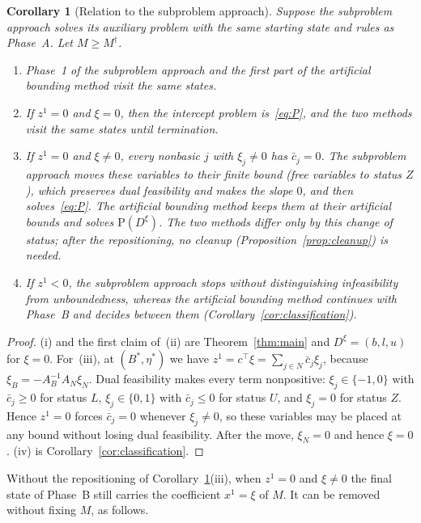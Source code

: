 \documentclass[11pt,a4paper]{article}
\theoremstyle{plain}
\newtheorem{corollary}[theorem]{Corollary}
\theoremstyle{definition}
\theoremstyle{remark}
\newcommand{\Pb}{\mathrm{P}}
\begin{document}
\begin{corollary}[Relation to the subproblem approach]
\label{cor:subproblem}
Suppose the subproblem approach solves its auxiliary problem with the same starting state and rules as Phase~A. Let $M\ge M^\dagger$.
\begin{enumerate}[label=(\roman*)]
\item Phase~1 of the subproblem approach and the first part of the artificial bounding method visit the same states.
\item If $z^1=0$ and $\xi=0$, then the intercept problem is~\eqref{eq:P}, and the two methods visit the same states until termination.
\item If $z^1=0$ and $\xi\neq0$, every nonbasic $j$ with $\xi_j\neq0$ has $\bar c_j=0$. The subproblem approach moves these variables to their finite bound (free variables to status $Z$), which preserves dual feasibility and makes the slope $0$, and then solves~\eqref{eq:P}. The artificial bounding method keeps them at their artificial bounds and solves $\Pb(D^\xi)$. The two methods differ only by this change of status; after the repositioning, no cleanup (Proposition~\ref{prop:cleanup}) is needed.
\item If $z^1<0$, the subproblem approach stops without distinguishing infeasibility from unboundedness, whereas the artificial bounding method continues with Phase~B and decides between them (Corollary~\ref{cor:classification}).
\end{enumerate}
\end{corollary}
\begin{proof}
(i) and the first claim of~(ii) are Theorem~\ref{thm:main} and $D^\xi=(b,l,u)$ for $\xi=0$. For~(iii), at $(B^\ast,\eta^\ast)$ we have $z^1=c^\top\xi=\sum_{j\in N}\bar c_j\xi_j$, because $\xi_B=-A_B^{-1}A_N\xi_N$. Dual feasibility makes every term nonpositive: $\xi_j\in\{-1,0\}$ with $\bar c_j\ge0$ for status $L$, $\xi_j\in\{0,1\}$ with $\bar c_j\le0$ for status $U$, and $\xi_j=0$ for status $Z$. Hence $z^1=0$ forces $\bar c_j=0$ whenever $\xi_j\neq0$, so these variables may be placed at any bound without losing dual feasibility. After the move, $\xi_N=0$ and hence $\xi=0$. (iv) is Corollary~\ref{cor:classification}.
\end{proof}

Without the repositioning of Corollary~\ref{cor:subproblem}(iii), when $z^1=0$ and $\xi\neq0$ the final state of Phase~B still carries the coefficient $x^1=\xi$ of $M$. It can be removed without fixing $M$, as follows.
\end{document}
